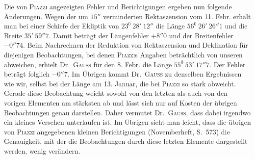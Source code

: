 Die von \textsc{Piazzi} angezeigten Fehler und Berichtigungen ergeben nun folgende Änderungen. Wegen der um $15''$ verminderten Rektaszension vom 11. Febr. erhält man bei einer Schiefe der Ekliptik von $23^0\ 28'\ 12''$ die Länge $56^0\ 26'\ 26''1$ und die Breite $35'\ 59''7$. Damit beträgt der Längenfehler $+8''0$ und der Breitenfehler $-0''74$. Beim Nachrechnen der Reduktion von Rektaszension und Deklination für diejenigen Beobachtungen, bei denen \textsc{Piazzi}s Angaben beträchtlich von unseren abweichen, erhielt Dr.\ \textsc{Gauss} für den 8. Febr. die Länge $55^0\ 53'\ 17''7$. Der Fehler beträgt folglich $-0''7$. Im Übrigen kommt Dr.\ \textsc{Gauss} zu denselben Ergebnissen wie wir, selbst bei der Länge am 13. Januar, die bei \textsc{Piazzi} so stark abweicht. Gerade diese Beobachtung weicht sowohl von den letzten als auch von den vorigen Elementen am stärksten ab und lässt sich nur auf Kosten der übrigen Beobachtungen genau darstellen. Daher vermutet Dr.\ \textsc{Gauss}, dass dabei irgendwo ein kleines Versehen unterlaufen ist. Im Übrigen sieht man leicht, dass die übrigen von \textsc{Piazzi} angegebenen kleinen Berichtigungen (Novemberheft, S.\ 573) die Genauigkeit, mit der die Beobachtungen durch diese letzten Elemente dargestellt werden, wenig verändern.

